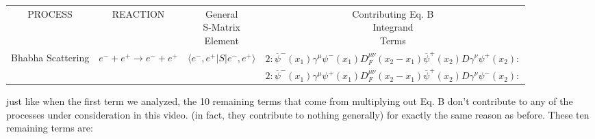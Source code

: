\documentclass[a4]{article}
\begin{document}
    \begin{framed}
        \begin{tabular}{c c c c}
            PROCESS & REACTION & \shortstack{General \\ S-Matrix \\ Element} & \shortstack{Contributing Eq. B \\ Integrand \\ Terms} \\
            Bhabha Scattering & $e^{-} + e^{+} \rightarrow e^{-} + e^{+}$ & $\langle e^{-} , e^{+} | S | e^{-} , e^{+} \rangle$ & $2 :\overline{\psi}^{-} (x_1) \gamma^{\mu} \psi^{-} (x_1) D_{F}^{\mu\nu} (x_2 - x_1) \overline{\psi}^{+} (x_2) D \gamma^{\nu} \psi^{+} (x_2):$ \\
            & & & $2 :\overline{\psi}^{-} (x_1) \gamma^{\mu} \psi^{+} (x_1) D_{F}^{\mu\nu} (x_2 - x_1) \overline{\psi}^{+} (x_2) D \gamma^{\nu} \psi^{-} (x_2):$
        \end{tabular}
    \end{framed}

    just like when the first term we analyzed, the 10 remaining terms that come from multiplying out Eq. B don't contribute to any of the processes under
    consideration in this video. (in fact, they contribute to nothing generally) for exactly the same reason as before. These ten remaining terms are:
\end{document}
